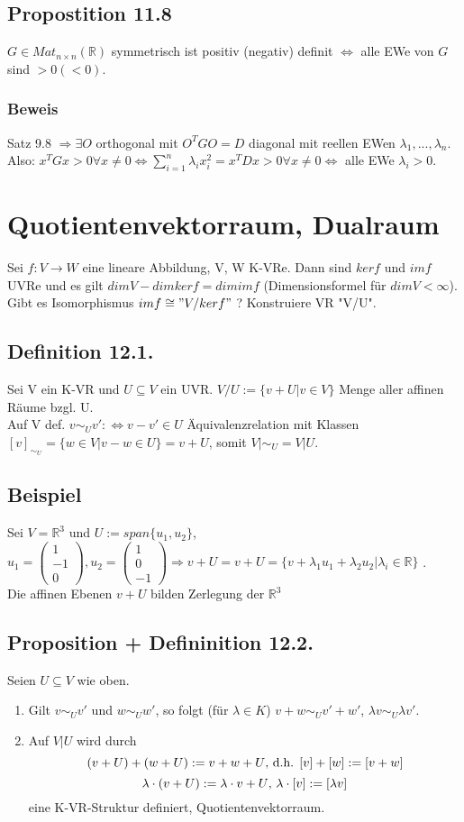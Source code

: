 \documentclass[a4paper, 12pt]{extarticle}
\newcommand{\vecThree}[3] {
	\left( 
	\begin{matrix}
		#1\\
		#2\\
		#3
	\end{matrix} 
	\right)
}
\newcommand{\gdw}{\Leftrightarrow}
\newcommand{\tn}[1]{\textnormal {#1}}
\begin{document}
\subsection*{Propostition 11.8}
$G \in Mat_{n\times n}(\mathbb{R})$ symmetrisch ist positiv (negativ) definit $\Leftrightarrow$ alle EWe von $G$ sind $>0 (<0)$.
\subsubsection*{Beweis}
Satz 9.8 $\Rightarrow \exists O$ orthogonal mit $O^TGO = D$ diagonal mit reellen EWen $\lambda_1,...,\lambda_n$. Also: $x^TGx > 0 \forall x \neq 0 \Leftrightarrow \sum_{i=1}^{n} \lambda_i x_i^2 = x^TDx > 0 \forall x \neq0 \Leftrightarrow$ alle EWe $\lambda_i > 0$.
\section{Quotientenvektorraum, Dualraum}
Sei $f:V\to W$ eine lineare Abbildung, V, W K-VRe. Dann sind $ker f$ und $im f$ UVRe und es gilt $dimV-dimkerf=dimimf$ (Dimensionsformel für $dimV < \infty$). Gibt es Isomorphismus $im f \cong "V/ kerf"$ ? Konstruiere VR "V/U".
\subsection*{Definition 12.1.}
Sei V ein K-VR und $U\subseteq V$ ein UVR. $V/U := \{v+U | v\in V\}$ Menge aller affinen Räume bzgl. U. \\
Auf V def. $v \sim_U v' :\gdw v-v'\in U$ Äquivalenzrelation mit Klassen $[v]_{\sim_U} = \{w\in V | v-w \in U\} = v+U$, somit $V|\sim_U = V|U$.
\subsection*{Beispiel}
Sei $V = \mathbb R^3$ und $U:= span\{u_1, u_2\}$, $u_1 = \vecThree{1}{-1}{0}, u_2 = \vecThree{1}{0}{-1} \Rightarrow v+U = v+U = \{v+\lambda_1u_1 + \lambda_2u_2 | \lambda_i \in \mathbb R\}$ . \\
Die affinen Ebenen $v + U$ bilden Zerlegung der $\mathbb R^3$
\subsection*{Proposition + Defininition 12.2.}
Seien $U\subseteq V$ wie oben.
\begin{enumerate}[label=\alph*)]
	\item  Gilt $v\sim_U v'$ und $w\sim_U w'$, so folgt (für $\lambda \in K$) $v+w \sim_U v'+w'$, $\lambda v \sim_U \lambda v'$.
	\item Auf $V|U$ wird durch
	$$(v+U) + (w+U) := v+w+U \tn{, d.h. } [v] + [w] := [v+w]$$
	$$\lambda \cdot (v+U) := \lambda \cdot v + U \tn{, } \lambda \cdot [v] := [\lambda v]$$
	eine K-VR-Struktur definiert, Quotientenvektorraum.
\end{enumerate}
\end{document}
